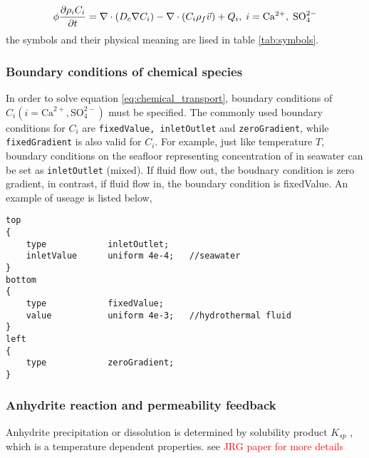 \begin{equation}
	\phi \frac{{\partial {\rho _i}{C_i}}}{{\partial t}} = \nabla  \cdot \left( {{D_c}\nabla {C_i}} \right) - \nabla  \cdot ({C_i}{\rho _f}\vec v) + {Q_i},\;i = {\rm{C}}{{\rm{a}}^{2 + }},\;{\rm{SO}}_4^{2 - }
	\label{eq:chemical_transport}
\end{equation}
the symbols and their physical meaning are lised in table \ref{tab:symbols}. 

\subsubsection{Boundary conditions of chemical species}
In order to solve equation \ref{eq:chemical_transport}, 
boundary conditions of $C_i (i=\text{Ca}^{2+}, \text{SO}_4^{2-})$ must be specified.
The commonly used boundary conditions for $C_i$ are \texttt{fixedValue, inletOutlet} and \texttt{zeroGradient}, 
while \texttt{fixedGradient} is also valid for $C_i$. 
For example, just like temperature $T$, \cca boundary conditions on the seafloor representing concentration of \ca in seawater can be set as \texttt{inletOutlet} (mixed). 
If fluid flow out, the boudnary condition is zero gradient, 
in contrast, if fluid flow in, the boundary condition is fixedValue. An example of useage is listed below,

\begin{verbatim}
top
{
	type            inletOutlet;
	inletValue      uniform 4e-4;	//seawater
}
bottom
{
	type            fixedValue;
	value           uniform 4e-3;	//hydrothermal fluid
}
left
{
	type            zeroGradient;
}
\end{verbatim}

\subsubsection{Anhydrite reaction and permeability feedback}
Anhydrite precipitation or dissolution is determined by solubility product $K_{sp}$ \citep{kawada2010formation}, which is a temperature dependent properties.
see \textcolor{red}{JRG paper for more details}

